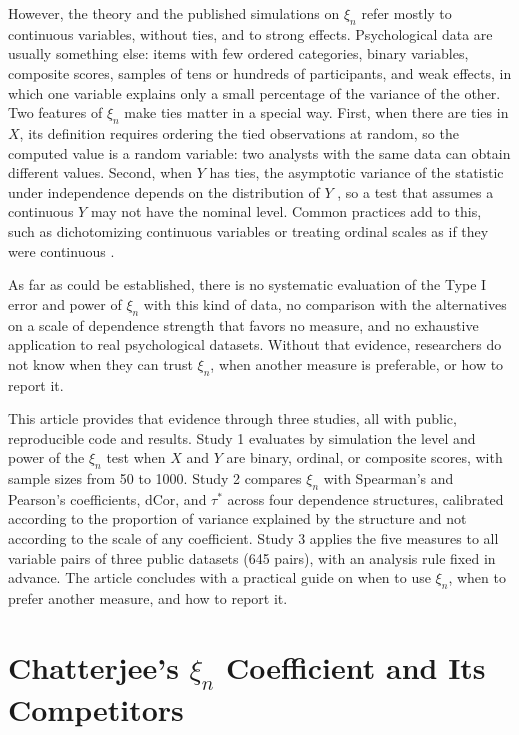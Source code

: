 \documentclass[man,mask,donotrepeattitle,floatsintext]{apa7}
\begin{document}
However, the theory and the published simulations on $\xi_n$ refer mostly to continuous variables, without ties, and to strong effects. Psychological data are usually something else: items with few ordered categories, binary variables, composite scores, samples of tens or hundreds of participants, and weak effects, in which one variable explains only a small percentage of the variance of the other. Two features of $\xi_n$ make ties matter in a special way. First, when there are ties in $X$, its definition requires ordering the tied observations at random, so the computed value is a random variable: two analysts with the same data can obtain different values. Second, when $Y$ has ties, the asymptotic variance of the statistic under independence depends on the distribution of $Y$ \parencite{chatterjee2021}, so a test that assumes a continuous $Y$ may not have the nominal level. Common practices add to this, such as dichotomizing continuous variables \parencite{maccallum2002} or treating ordinal scales as if they were continuous \parencite{liddell2018}.

As far as could be established, there is no systematic evaluation of the Type I error and power of $\xi_n$ with this kind of data, no comparison with the alternatives on a scale of dependence strength that favors no measure, and no exhaustive application to real psychological datasets. Without that evidence, researchers do not know when they can trust $\xi_n$, when another measure is preferable, or how to report it.

This article provides that evidence through three studies, all with public, reproducible code and results. Study 1 evaluates by simulation the level and power of the $\xi_n$ test when $X$ and $Y$ are binary, ordinal, or composite scores, with sample sizes from 50 to 1000. Study 2 compares $\xi_n$ with Spearman's and Pearson's coefficients, dCor, and $\tau^*$ across four dependence structures, calibrated according to the proportion of variance explained by the structure and not according to the scale of any coefficient. Study 3 applies the five measures to all variable pairs of three public datasets (645 pairs), with an analysis rule fixed in advance. The article concludes with a practical guide on when to use $\xi_n$, when to prefer another measure, and how to report it.

\section{Chatterjee's $\xi_n$ Coefficient and Its Competitors}
\end{document}
